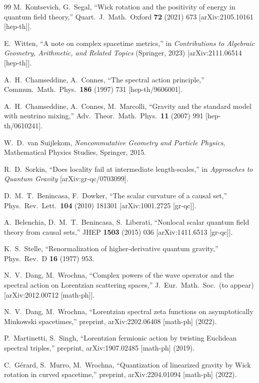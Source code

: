 \documentclass[12pt,a4paper]{article}
\theoremstyle{definition}
\theoremstyle{remark}
\begin{document}
\begin{thebibliography}{99}
  M.~Kontsevich, G.~Segal,
  ``Wick rotation and the positivity of energy in quantum field
  theory,''
  Quart.\ J.\ Math.\ Oxford \textbf{72} (2021) 673
  [arXiv:2105.10161 [hep-th]].

  E.~Witten,
  ``A note on complex spacetime metrics,''
  in \emph{Contributions to Algebraic Geometry, Arithmetic, and
  Related Topics} (Springer, 2023)
  [arXiv:2111.06514 [hep-th]].

  A.~H.~Chamseddine, A.~Connes,
  ``The spectral action principle,''
  Commun.\ Math.\ Phys.\ \textbf{186} (1997) 731
  [hep-th/9606001].

  A.~H.~Chamseddine, A.~Connes, M.~Marcolli,
  ``Gravity and the standard model with neutrino mixing,''
  Adv.\ Theor.\ Math.\ Phys.\ \textbf{11} (2007) 991
  [hep-th/0610241].

  W.~D.~van Suijlekom,
  \emph{Noncommutative Geometry and Particle Physics},
  Mathematical Physics Studies, Springer, 2015.

  R.~D.~Sorkin,
  ``Does locality fail at intermediate length-scales,''
  in \emph{Approaches to Quantum Gravity}
  [arXiv:gr-qc/0703099].

  D.~M.~T.~Benincasa, F.~Dowker,
  ``The scalar curvature of a causal set,''
  Phys.\ Rev.\ Lett.\ \textbf{104} (2010) 181301
  [arXiv:1001.2725 [gr-qc]].

  A.~Belenchia, D.~M.~T.~Benincasa, S.~Liberati,
  ``Nonlocal scalar quantum field theory from causal sets,''
  JHEP \textbf{1503} (2015) 036
  [arXiv:1411.6513 [gr-qc]].

  K.~S.~Stelle,
  ``Renormalization of higher-derivative quantum gravity,''
  Phys.\ Rev.\ D \textbf{16} (1977) 953.

  N.~V.~Dang, M.~Wrochna,
  ``Complex powers of the wave operator and the spectral action on
  Lorentzian scattering spaces,''
  J.\ Eur.\ Math.\ Soc.\ (to appear)
  [arXiv:2012.00712 [math-ph]].

  N.~V.~Dang, M.~Wrochna,
  ``Lorentzian spectral zeta functions on asymptotically Minkowski
  spacetimes,''
  preprint, arXiv:2202.06408 [math-ph] (2022).

  P.~Martinetti, S.~Singh,
  ``Lorentzian fermionic action by twisting Euclidean spectral
  triples,''
  preprint, arXiv:1907.02485 [math-ph] (2019).

  C.~G\'{e}rard, S.~Murro, M.~Wrochna,
  ``Quantization of linearized gravity by Wick rotation in curved
  spacetime,''
  preprint, arXiv:2204.01094 [math-ph] (2022).

\end{thebibliography}
\end{document}
